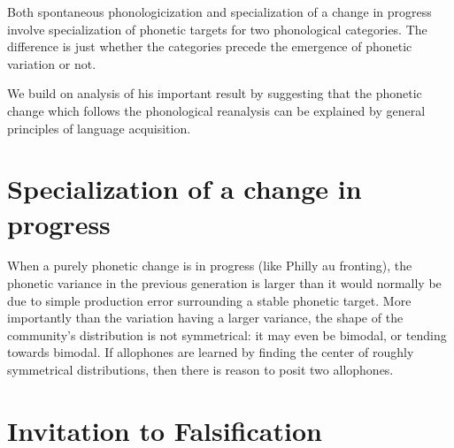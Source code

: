 Both spontaneous phonologicization and specialization of a change in progress involve specialization of phonetic targets for two phonological categories. The difference is just whether the categories precede the emergence of phonetic variation or not.

We build on \citet{fruehwald2013} analysis of his important result by suggesting that the phonetic change which follows the phonological reanalysis can be explained by general principles of language acquisition.

\section{Specialization of a change in progress}
\label{newzea}

When a purely phonetic change is in progress (like Philly au fronting), the phonetic variance in the previous generation is larger than it would normally be due to simple production error surrounding a stable phonetic target. More importantly than the variation having a larger variance, the shape of the community's distribution is not symmetrical: it may even be bimodal, or tending towards bimodal. If allophones are learned by finding the center of roughly symmetrical distributions, then there is reason to posit two allophones.





\section{Invitation to Falsification}
\label{test}

